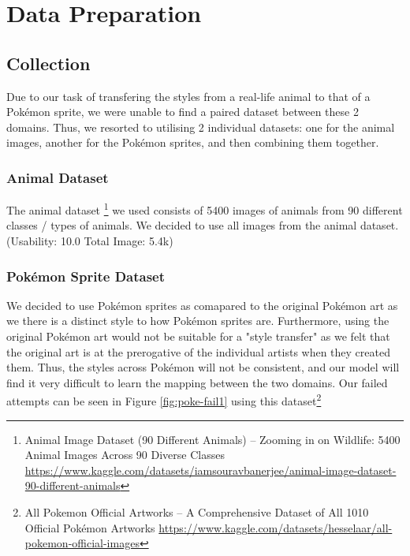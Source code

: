 \documentclass[twoside,english,notitlepage]{report}
\begin{document}
\section{Data Preparation}
\subsection{Collection}
Due to our task of transfering the styles from a real-life animal to that of a Pokémon sprite, we were unable to find a paired dataset between these 2 domains. Thus, we resorted to utilising 2 individual datasets: one for the animal images, another for the Pokémon sprites, and then combining them together.

\subsubsection{Animal Dataset}
The animal dataset \footnote{Animal Image Dataset (90 Different Animals) – Zooming in on Wildlife: 5400 Animal Images Across 90 Diverse Classes \href{https://www.kaggle.com/datasets/iamsouravbanerjee/animal-image-dataset-90-different-animals}{https://www.kaggle.com/datasets/iamsouravbanerjee/animal-image-dataset-90-different-animals}} we used consists of 5400 images of animals from 90 different classes / types of animals. We decided to use all images from the animal dataset. (Usability: 10.0 Total Image: 5.4k)



\subsubsection{Pokémon Sprite Dataset}
We decided to use Pokémon sprites as comapared to the original Pokémon art as we there is a distinct style to how Pokémon sprites are. Furthermore, using the original Pokémon art would not be suitable for a "style transfer" as we felt that the original art is at the prerogative of the individual artists when they created them. Thus, the styles across Pokémon will not be consistent, and our model will find it very difficult to learn the mapping between the two domains. Our failed attempts can be seen in Figure \ref{fig:poke-fail1} using this dataset\footnote{All Pokemon Official Artworks – A Comprehensive Dataset of All 1010 Official Pokémon Artworks \href{https://www.kaggle.com/datasets/hesselaar/all-pokemon-official-images}{https://www.kaggle.com/datasets/hesselaar/all-pokemon-official-images}}
\end{document}
